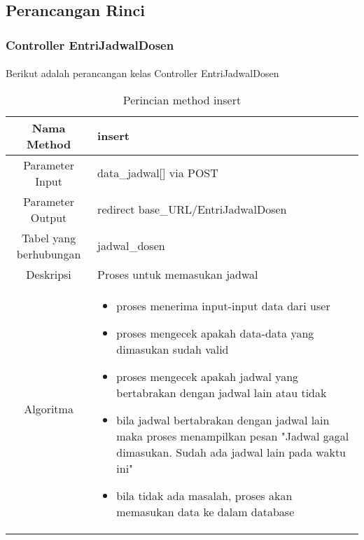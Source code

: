 \subsection{Perancangan Rinci}
\subsubsection{Controller EntriJadwalDosen}
\paragraph{} Berikut adalah perancangan kelas Controller EntriJadwalDosen \\
\begin{center}
	\begin{table}[H]
\begin{tabular}{|c|p{11cm}|}
\hline
Nama Method 	& 	insert 	\\
\hline
Parameter Input & data\_jadwal[] via POST \\
\hline
Parameter Output & redirect base\_URL/EntriJadwalDosen\\
\hline
Tabel yang berhubungan & jadwal\_dosen \\
\hline
Deskripsi	& Proses untuk memasukan jadwal \\
\hline
Algoritma	& \begin{itemize}
				\item proses menerima input-input data dari user
				\item proses mengecek apakah data-data yang dimasukan sudah valid
				\item proses mengecek apakah jadwal yang bertabrakan dengan jadwal lain atau tidak
				\item bila jadwal bertabrakan dengan jadwal lain maka proses menampilkan pesan "Jadwal gagal dimasukan. Sudah ada jadwal lain pada waktu ini"
				\item bila tidak ada masalah, proses akan memasukan data ke dalam database
				\end{itemize} \\
\hline
\end{tabular}
\caption{Perincian method insert}
\end{table}
\end{center}

